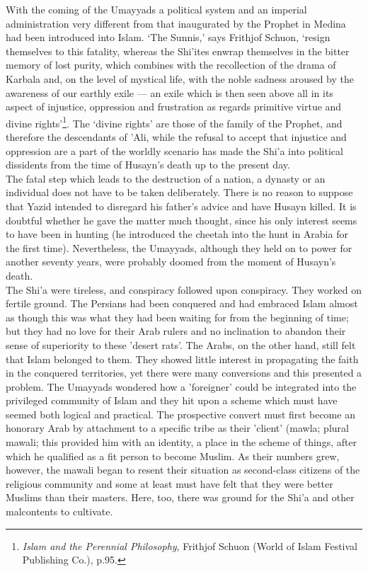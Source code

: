 \documentclass[10pt, twoside]{book}
\begin{document}
With the coming of the Umayyads a political system and an imperial administration very different from 
that inaugurated by the Prophet in Medina had been introduced into Islam. `The Sunnis,' says Frithjof 
Schuon, `resign themselves to this fatality, whereas the Shi'ites enwrap themselves in the bitter 
memory of lost purity, which combines with the recollection of the drama of Karbala and, on the level 
of mystical life, with the noble sadness aroused by the awareness of our earthly exile --- an exile 
which is then seen above all in its aspect of injustice, oppression and frustration as regards 
primitive virtue and divine rights'\footnote{\emph{Islam and the Perennial Philosophy}, Frithjof Schuon (World of Islam Festival Publishing Co.), p.95.}. The `divine rights' are those of the family of the Prophet, 
and therefore the descendants of 'Ali, while the refusal to accept that injustice and oppression are 
a part of the worldly scenario has made the Shi'a into political dissidents from the time of Husayn's 
death up to the present day. \\

The fatal step which leads to the destruction of a nation, a dynasty or an individual does not have 
to be taken deliberately. There is no reason to suppose that Yazid intended to disregard his father's 
advice and have Husayn killed. It is doubtful whether he gave the matter much thought, since his only 
interest seems to have been in hunting (he introduced the cheetah into the hunt in Arabia for the 
first time). Nevertheless, the Umayyads, although they held on to power for another seventy years, 
were probably doomed from the moment of Husayn's death. \\

The Shi'a were tireless, and conspiracy followed upon conspiracy. They worked on fertile ground. The 
Persians had been conquered and had embraced Islam almost as though this was what they had been 
waiting for from the beginning of time; but they had no love for their Arab rulers and no inclination 
to abandon their sense of superiority to these 'desert rats'. The Arabs, on the other hand, still 
felt that Islam belonged to them. They showed little interest in propagating the faith in the 
conquered territories, yet there were many conversions and this presented a problem. The Umayyads 
wondered how a 'foreigner' could be integrated into the privileged community of Islam and they hit 
upon a scheme which must have seemed both logical and practical. The prospective convert must first 
become an honorary Arab by attachment to a specific tribe as their 'client' (mawla; plural mawali; 
this provided him with an identity, a place in the scheme of things, after which he qualified as a 
fit person to become Muslim. As their numbers grew, however, the mawali began to resent their 
situation as second\hyp{}class citizens of the religious community and some at least must have felt that 
they were better Muslims than their masters. Here, too, there was ground for the Shi'a and other 
malcontents to cultivate. \\
\end{document}
